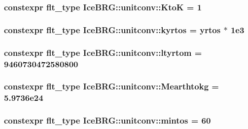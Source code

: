 \subsubsection[{Kto\+K}]{\setlength{\rightskip}{0pt plus 5cm}constexpr {\bf flt\+\_\+type} Ice\+B\+R\+G\+::unitconv\+::\+Kto\+K = 1}\label{namespaceIceBRG_1_1unitconv_aac1606e07695af7671017f914e88fcaf}
\hypertarget{namespaceIceBRG_1_1unitconv_af347d927cc3206bd2f82029580cdc1ad}{}
\subsubsection[{kyrtos}]{\setlength{\rightskip}{0pt plus 5cm}constexpr {\bf flt\+\_\+type} Ice\+B\+R\+G\+::unitconv\+::kyrtos = {\bf yrtos} $\ast$ 1e3}\label{namespaceIceBRG_1_1unitconv_af347d927cc3206bd2f82029580cdc1ad}
\hypertarget{namespaceIceBRG_1_1unitconv_a9774e861945da1ba7c27aa88b2b6b221}{}
\subsubsection[{ltyrtom}]{\setlength{\rightskip}{0pt plus 5cm}constexpr {\bf flt\+\_\+type} Ice\+B\+R\+G\+::unitconv\+::ltyrtom = 9460730472580800}\label{namespaceIceBRG_1_1unitconv_a9774e861945da1ba7c27aa88b2b6b221}
\hypertarget{namespaceIceBRG_1_1unitconv_a7c0f68724a137ea0d3f4aec1fb3af356}{}
\subsubsection[{Mearthtokg}]{\setlength{\rightskip}{0pt plus 5cm}constexpr {\bf flt\+\_\+type} Ice\+B\+R\+G\+::unitconv\+::\+Mearthtokg = 5.\+9736e24}\label{namespaceIceBRG_1_1unitconv_a7c0f68724a137ea0d3f4aec1fb3af356}
\hypertarget{namespaceIceBRG_1_1unitconv_a322788e3e58b45ac08d57e2e1e2ede0a}{}
\subsubsection[{mintos}]{\setlength{\rightskip}{0pt plus 5cm}constexpr {\bf flt\+\_\+type} Ice\+B\+R\+G\+::unitconv\+::mintos = 60}\label{namespaceIceBRG_1_1unitconv_a322788e3e58b45ac08d57e2e1e2ede0a}
\hypertarget{namespaceIceBRG_1_1unitconv_af1314a212005ed6b7d3fa6d2451feb45}{}

